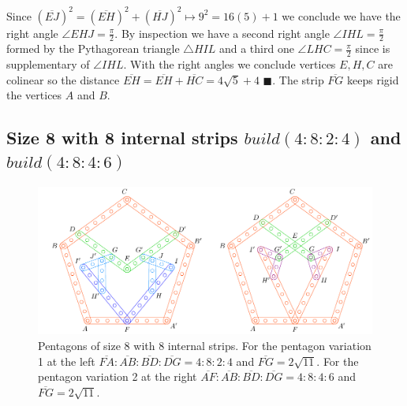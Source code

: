 \documentclass[11pt]{article}
\begin{document}
Since $(\overline{EJ})^2 = (\overline{EH})^2 + (\overline{HJ})^2 \mapsto 9^2 = 16(5) + 1$ we conclude we have the right angle $\angle{EHJ} = \frac{\pi}2$. By inspection we have a second right angle $\angle{IHL} = \frac{\pi}2$ formed by the Pythagorean triangle $\triangle{HIL}$ and a third one $\angle{LHC} = \frac{\pi}2$ since is supplementary of $\angle{IHL}$. With the right angles we conclude vertices $E,H,C$ are colinear so the distance $\overline{EH} = \overline{EH} + \overline{HC} = 4\sqrt{5} + 4$ $\blacksquare$.
The strip $\overline{FG}$ keeps rigid the vertices $A$ and $B$.

\subsection{Size 8 with 8 internal strips $build(4:8:2:4)$ and $build(4:8:4:6)$}

\begin{figure}[H]
\centering
\includegraphics[scale=1]{8/penta8-8a}
\caption{Pentagons of size 8 with 8 internal strips. For the pentagon variation 1 at the left $\overline{FA}:\overline{AB}:\overline{BD}:\overline{DG} = 4:8:2:4$ and $\overline{FG}=2\sqrt{11}$. For the pentagon variation 2 at the right $\overline{AF}:\overline{AB}:\overline{BD}:\overline{DG} = 4:8:4:6$ and $\overline{FG}=2\sqrt{11}$.}
\label{fig:penta8-8a}
\end{figure}
\end{document}
